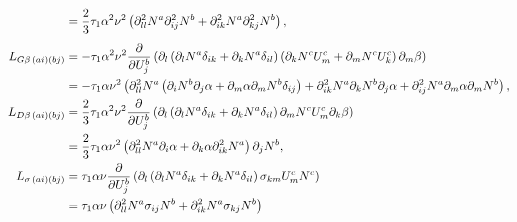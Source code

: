 \begin{align}
                          & =\vphantom{\frac{\partial }{\partial U_j^b}} \frac{2}{3}\tau_1 \alpha^2 \nu^2\left( \partial^2_{ll} N^a \partial^2_{ij} N^b + \partial^2_{ik} N^a \partial^2_{kj}N^b \right), \label{eq:LCLHSStabilizationTerm}                                                                                               \\
  L_{G \beta \, (ai)(bj)} & = - \tau_1 \alpha^2 \nu^2 \frac{\partial }{\partial U_j^b} \left( \partial_l \left( \partial_l N^a \delta_{ik} + \partial_k N^a \delta_{il} \right) \left( \partial_k N^c U_m^c + \partial_m N^c U_k^c \right) \partial_m \beta \right) \notag                                                                  \\
                          & = - \tau_1 \alpha \nu^2 \left( \partial_{ll}^2 N^a \left( \partial_i N^b \partial_j \alpha + \partial_m \alpha \partial_m N^b \delta_{ij}\right) + \partial_{ik}^2 N^a \partial_k N^b \partial_j \alpha + \partial_{ij}^2 N^a \partial_m \alpha \partial_m N^b \right), \label{eq:LGBetaLHSStabilizationTerm}                                                                                                                                                                                                                                                       \\
  L_{D \beta \, (ai)(bj)} & = \frac{2}{3} \tau_1 \alpha^2 \nu^2 \frac{\partial }{\partial U_j^b} \left( \partial_l \left( \partial_l N^a \delta_{ik} + \partial_k N^a \delta_{il} \right) \partial_m N^c U_m^c \partial_k \beta \right) \notag                                                                                                                  \\
                          & = \frac{2}{3} \tau_1 \alpha \nu^2 \left( \partial_{ll}^2 N^a \partial_i \alpha + \partial_k \alpha \partial_{ik}^2 N^a \right) \partial_j N^b, \label{eq:LDBetaLHSStabilizationTerm}                                                                                                                                                      \\
  L_{\sigma\, (ai)(bj)}   & = \tau_1 \alpha \nu \frac{\partial }{\partial U_j^b} \left( \partial_l \left( \partial_l N^a \delta_{ik} + \partial_k N^a \delta_{il} \right) \sigma_{km} U_m^c N^c \right) \notag                                                                                                                                                        \\
                          & = \tau_1 \alpha \nu \left( \partial_{ll}^2 N^a \sigma_{ij} N^b + \partial_{ik}^2 N^a \sigma_{kj} N^b \right) \label{eq:LSigmaLHSStabilizationTerm}                                                                                                                                                                                        \\

\end{align}

